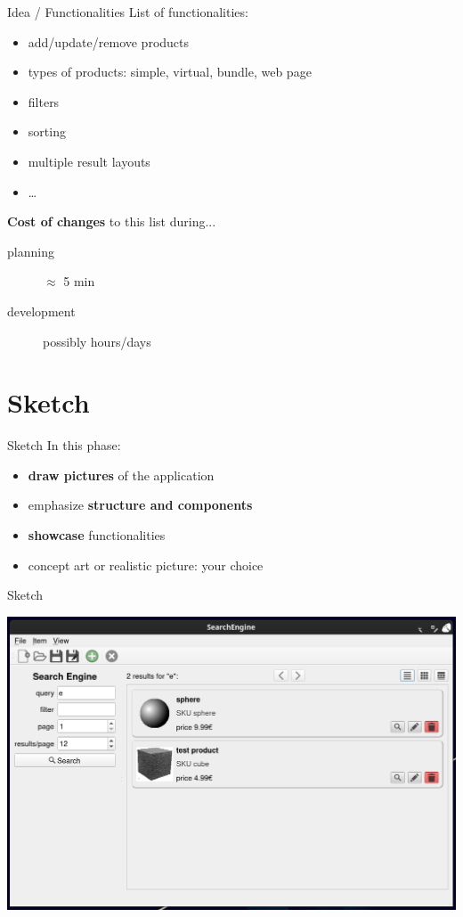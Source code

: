 \documentclass[11pt]{beamer}
\renewcommand{\emph}[1]{\textbf{#1}}
\begin{document}
\begin{frame}{Idea / Functionalities}
 List of functionalities:
 
 \begin{itemize}
  \item add/update/remove products
  \item types of products: simple, virtual, bundle, web page
  \item filters
  \item sorting
  \item multiple result layouts
  \item \ldots
 \end{itemize}
 
 \emph{Cost of changes} to this list during...
 \begin{description}
  \item[planning] $\approx$ 5 min
  \item[development] possibly hours/days
 \end{description}
\end{frame}


\section{Sketch}
\begin{frame}{Sketch}
 In this phase:
 
 \begin{itemize}
  \item \emph{draw pictures} of the application
  \item emphasize \emph{structure and components}
  \item \emph{showcase} functionalities
  \item concept art or realistic picture: your choice
 \end{itemize}
\end{frame}


\begin{frame}{Sketch}
 \begin{center}
  \includegraphics[height=0.55\textwidth]{assets/figure-search-engine-1}
 \end{center}
\end{frame}
\end{document}
